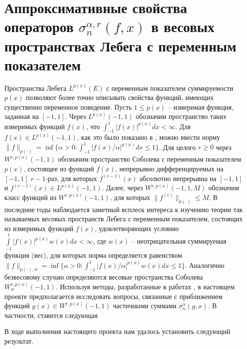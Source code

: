 \chapter{Аппроксимативные свойства операторов $\sigma^{\alpha,r}_n(f,x)$ в весовых пространствах Лебега с переменным показателем}

Пространства Лебега $L^{p(x)}(E)$ с переменным показателем суммируемости $p(x)$ позволяют более точно описывать свойства функций, имеющих существенно переменное поведение. %
Пусть $1\le p(x)$ -- измеримая функция, заданная на $[-1,1]$. Через $L^{p(x)}(-1,1)$ обозначим пространство таких измеримых функций $f(x)$, что $\int_{-1}^1|f(x)|^{p(x)}dx <\infty$. Для $f(x)\in L^{p(x)}(-1,1)$, как это было показано в \cite{rffi-20}, можно  ввести норму $\|f\|_{p(\cdot)}=\inf\{\alpha>0:\int_{-1}^1|f(x)/\alpha|^{p(x)}dx\le1\}$. Для целого $r\ge0$
через $W^{r,p(x)}(-1,1)$ обозначим пространство Соболева с переменным показателем $p(x)$, состоящее из функций $f(x)$, непрерывно дифференцируемых на $[-1,1]$ $r-1$-раз, для которых $f^{(r-1)}(x)$ абсолютно непрерывна на $[-1,1]$  и $f^{(r-1)}(x)\in L^{p(x)}(-1,1)$.
Далее, через  $W^{r,p(x)}(-1,1,M)$ обозначим класс функций из $W^{r,p(x)}(-1,1)$, для которых $\|f^{(r)}\|_{p(\cdot)}\le M$.
В последние годы наблюдается заметный всплеск интереса к изучению теории так называемых весовых пространств Лебега с переменным показателем, состоящих из измеримых функций $f(x)$, удовлетворяющих условию $\int\limits_{-1}^{1} |f(x)|^{p(x)} w(x) dx < \infty$, где $w(x)$ -- неотрицательная суммируемая функция (вес), для которых норма определяется равенством $\|f\|_{p(\cdot),w}=\inf\{\alpha>0:\int_{-1}^1|f(x)/\alpha|^{p(x)}w(x)dx\le1\}$. Аналогично безвесовому случаю определяются весовые пространства Соболева $W^{r,p(x)}_w(-1,1)$. Используя методы, разработанные в работах \cite{rffi-26, rffi-27, rffi-28, rffi-29, rffi-30, rffi-31, rffi-32}, в настоящем проекте предполагается исследовать вопросы, связанные с приближением функций $g(x)\in W^{r,p(x)}(-1,1)$ частичными суммами $\sigma_n^\alpha(g,x)$. В частности, ставится следующая

В ходе выполнения настоящего проекта нам  удалось установить следующий результат.

